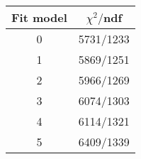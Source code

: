 \begin{tabular}{c|c}
Fit model & $\chi^2/$ndf \\
\hline
0 & 5731/1233\\
1 & 5869/1251\\
2 & 5966/1269\\
3 & 6074/1303\\
4 & 6114/1321\\
5 & 6409/1339\\
\end{tabular}
